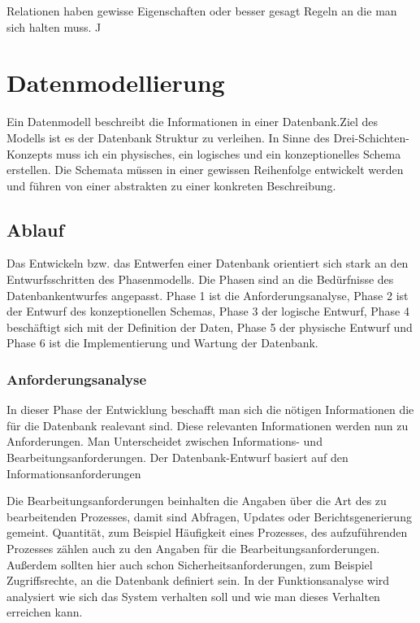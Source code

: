 \begin{flushleft}
Relationen haben gewisse Eigenschaften oder besser gesagt Regeln an die man sich halten muss. J

\section{Datenmodellierung} \label{Datenmodell}


Ein Datenmodell beschreibt die Informationen in einer Datenbank.Ziel des Modells ist es der Datenbank Struktur zu verleihen. In Sinne des Drei-Schichten-Konzepts muss ich ein physisches, ein logisches und ein konzeptionelles Schema erstellen. Die Schemata müssen in einer gewissen Reihenfolge entwickelt werden und führen von einer abstrakten zu einer konkreten Beschreibung. 

\subsection{Ablauf} 
Das Entwickeln bzw. das Entwerfen einer Datenbank orientiert sich stark an den Entwurfsschritten des Phasenmodells. Die Phasen sind an die Bedürfnisse des Datenbankentwurfes angepasst. Phase 1 ist die Anforderungsanalyse, Phase 2 ist der Entwurf des konzeptionellen Schemas, Phase 3 der logische Entwurf, Phase 4 beschäftigt sich mit der Definition der Daten, Phase 5 der physische Entwurf und Phase 6 ist die Implementierung und Wartung der Datenbank.

\subsubsection{Anforderungsanalyse}
In dieser Phase der Entwicklung beschafft man sich die nötigen Informationen die für die Datenbank realevant sind. Diese relevanten Informationen werden nun zu Anforderungen. Man Unterscheidet zwischen Informations- und Bearbeitungsanforderungen. 
Der Datenbank-Entwurf basiert auf den Informationsanforderungen

Die Bearbeitungsanforderungen beinhalten die Angaben über die Art des zu bearbeitenden Prozesses, damit sind Abfragen, Updates oder Berichtsgenerierung gemeint. Quantität, zum Beispiel Häufigkeit eines Prozesses, des aufzuführenden Prozesses zählen auch zu den Angaben für die Bearbeitungsanforderungen. Außerdem sollten hier auch schon Sicherheitsanforderungen, zum Beispiel Zugriffsrechte, an die Datenbank definiert sein. In der Funktionsanalyse wird analysiert wie sich das System verhalten soll und wie man dieses Verhalten erreichen kann.


\end{flushleft}

